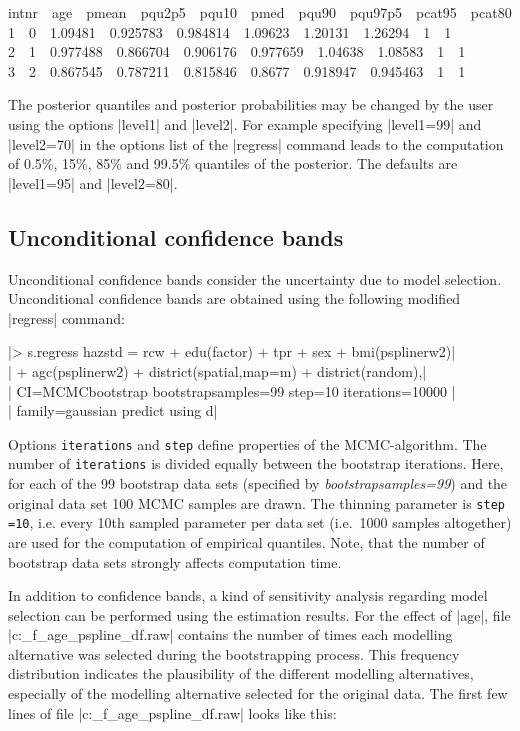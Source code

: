 {\footnotesize
 intnr \,\, age \,\, pmean \,\, pqu2p5 \,\, pqu10 \,\, pmed \,\, pqu90 \,\, pqu97p5 \,\, pcat95 \,\, pcat80\\
1 \,\,  0 \,\,  1.09481 \,\,  0.925783 \,\,  0.984814  \,\, 1.09623  \,\, 1.20131  \,\, 1.26294 \,\,  1 \,\,  1 \\
2 \,\,  1 \,\,  0.977488 \,\,  0.866704 \,\,  0.906176 \,\,  0.977659  \,\, 1.04638  \,\, 1.08583 \,\,  1 \,\,  1 \\
3 \,\,  2 \,\,  0.867545 \,\,  0.787211 \,\,  0.815846 \,\,  0.8677 \,\,  0.918947 \,\,  0.945463 \,\,  1 \,\,  1}

The posterior quantiles and posterior probabilities may be changed by the user using the options |level1| and |level2|. For
example specifying |level1=99| and |level2=70| in the options list of the |regress| command leads to the computation of 0.5\%,
15\%, 85\% and 99.5\% quantiles of the posterior. The defaults are |level1=95| and |level2=80|.


\subsection{Unconditional confidence bands}\label{step:uncond}

Unconditional confidence bands consider the uncertainty due to model selection. Unconditional confidence bands are obtained using the following modified
 |regress| command:

 |> s.regress hazstd = rcw + edu(factor) + tpr + sex + bmi(psplinerw2)|\\
 |  + agc(psplinerw2) + district(spatial,map=m) + district(random),|\\
 |  CI=MCMCbootstrap bootstrapsamples=99 step=10 iterations=10000 |\\
 |  family=gaussian predict using d|

Options {\tt iterations} and {\tt step} define properties of the MCMC-algorithm. The number of {\tt iterations} is
divided equally between the bootstrap iterations. Here, for each of the 99 bootstrap data sets (specified by {\it
bootstrapsamples=99}) and the original data set 100 MCMC samples are drawn. The thinning parameter is {\tt step =10}, i.e. every  10th
sampled parameter per data set (i.e.~1000 samples altogether) are used for the computation of empirical quantiles. Note, that the number
of bootstrap data sets strongly affects computation time.

In addition to confidence bands, a kind of sensitivity analysis regarding model selection can be performed using the estimation
results. For the effect of |age|, file |c:\data\s_f_age_pspline_df.raw| contains the number of times each modelling alternative
was selected during the bootstrapping process. This frequency distribution indicates the plausibility of the different
modelling alternatives, especially of the modelling alternative selected for the original data. The first few lines of file
|c:\data\s_f_age_pspline_df.raw| looks like this:

